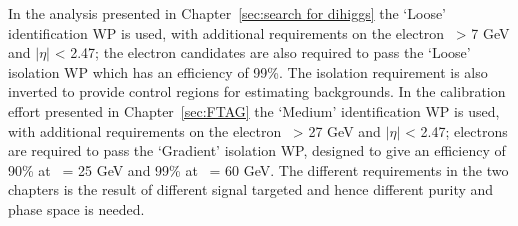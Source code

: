 In the analysis presented in Chapter~\ref{sec:search for dihiggs} 
the `Loose' identification WP is used, 
with additional requirements on the electron \pt\ > 7 GeV and $|\eta|$ < 2.47;
the electron candidates are also required
to pass the ‘Loose’ isolation WP which has an efficiency of 99\%. 
The isolation requirement is also 
inverted to provide control regions for estimating backgrounds.
In the calibration effort presented in Chapter~\ref{sec:FTAG} 
the `Medium' identification WP is used, 
with additional requirements on the electron \pt\ > 27 GeV and $|\eta|$ < 2.47;
electrons are required to pass the `Gradient' isolation WP,
designed to give an efficiency of 90\% at \pt\ = 25 GeV and 99\% at \pt\ = 60 GeV.
The different requirements in the two chapters 
is the result of different signal targeted and hence different 
purity and phase space is needed. 








